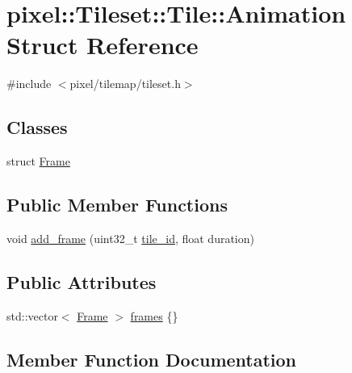 \hypertarget{structpixel_1_1_tileset_1_1_tile_1_1_animation}{}\section{pixel\+:\+:Tileset\+:\+:Tile\+:\+:Animation Struct Reference}
\label{structpixel_1_1_tileset_1_1_tile_1_1_animation}


{\ttfamily \#include $<$pixel/tilemap/tileset.\+h$>$}

\subsection*{Classes}
\begin{DoxyCompactItemize}
\item 
struct \hyperlink{structpixel_1_1_tileset_1_1_tile_1_1_animation_1_1_frame}{Frame}
\end{DoxyCompactItemize}
\subsection*{Public Member Functions}
\begin{DoxyCompactItemize}
\item 
void \hyperlink{structpixel_1_1_tileset_1_1_tile_1_1_animation_a11f0be5eef21c355e1e423d1efe864c8}{add\+\_\+frame} (uint32\+\_\+t \hyperlink{structpixel_1_1_tileset_1_1_tile_aea8eb01c2f67c1cac8cbf12bbbf3d741}{tile\+\_\+id}, float duration)
\end{DoxyCompactItemize}
\subsection*{Public Attributes}
\begin{DoxyCompactItemize}
\item 
std\+::vector$<$ \hyperlink{structpixel_1_1_tileset_1_1_tile_1_1_animation_1_1_frame}{Frame} $>$ \hyperlink{structpixel_1_1_tileset_1_1_tile_1_1_animation_aa7752cf4088a9a395a0e5e470c906205}{frames} \{\}
\end{DoxyCompactItemize}


\subsection{Member Function Documentation}
\mbox{\label{structpixel_1_1_tileset_1_1_tile_1_1_animation_a11f0be5eef21c355e1e423d1efe864c8}} 
